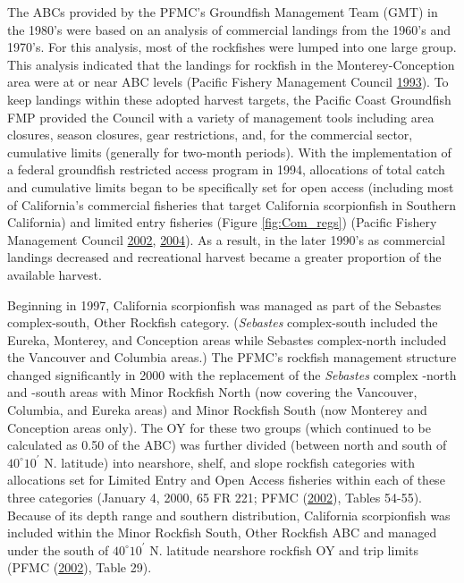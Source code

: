 \documentclass[12pt,]{article}
\begin{document}
The ABCs provided by the PFMC's Groundfish Management Team (GMT) in the
1980's were based on an analysis of commercial landings from the 1960's
and 1970's. For this analysis, most of the rockfishes were lumped into
one large group. This analysis indicated that the landings for rockfish
in the Monterey-Conception area were at or near ABC levels (Pacific
Fishery Management Council \protect\hyperlink{ref-PFMC1993}{1993}). To
keep landings within these adopted harvest targets, the Pacific Coast
Groundfish FMP provided the Council with a variety of management tools
including area closures, season closures, gear restrictions, and, for
the commercial sector, cumulative limits (generally for two-month
periods). With the implementation of a federal groundfish restricted
access program in 1994, allocations of total catch and cumulative limits
began to be specifically set for open access (including most of
California's commercial fisheries that target California scorpionfish in
Southern California) and limited entry fisheries (Figure
\ref{fig:Com_regs}) (Pacific Fishery Management Council
\protect\hyperlink{ref-PFMC2002}{2002},
\protect\hyperlink{ref-PFMC2004}{2004}). As a result, in the later
1990's as commercial landings decreased and recreational harvest became
a greater proportion of the available harvest.

Beginning in 1997, California scorpionfish was managed as part of the
Sebastes complex-south, Other Rockfish category. (\emph{Sebastes}
complex-south included the Eureka, Monterey, and Conception areas while
Sebastes complex-north included the Vancouver and Columbia areas.) The
PFMC's rockfish management structure changed significantly in 2000 with
the replacement of the \emph{Sebastes} complex -north and -south areas
with Minor Rockfish North (now covering the Vancouver, Columbia, and
Eureka areas) and Minor Rockfish South (now Monterey and Conception
areas only). The OY for these two groups (which continued to be
calculated as 0.50 of the ABC) was further divided (between north and
south of \(40^\circ 10^\prime\) N. latitude) into nearshore, shelf, and
slope rockfish categories with allocations set for Limited Entry and
Open Access fisheries within each of these three categories (January 4,
2000, 65 FR 221; PFMC (\protect\hyperlink{ref-PFMC2002}{2002}), Tables
54-55). Because of its depth range and southern distribution, California
scorpionfish was included within the Minor Rockfish South, Other
Rockfish ABC and managed under the south of \(40^\circ 10^\prime\) N.
latitude nearshore rockfish OY and trip limits (PFMC
(\protect\hyperlink{ref-PFMC2002}{2002}), Table 29).
\end{document}
